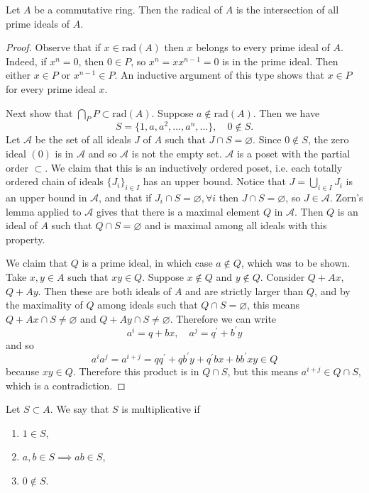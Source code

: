 \begin{theorem}
Let $A$ be a commutative ring. Then the radical of $A$ is the
intersection of all prime ideals of $A$.
\end{theorem}
\begin{proof}
Observe that if $x \in \mathrm{rad}(A)$ then $x$ belongs to every
prime ideal of $A$. Indeed, if $x^n = 0$, then $0 \in P$, so
$x^n = x x^{n-1} = 0$ is in the prime ideal. Then either $x \in P$ or
$x^{n-1} \in P$. An inductive argument of this type shows that $x \in
P$ for every prime ideal $x$.

Next show that $\bigcap_P P \subset \mathrm{rad}(A)$.
Suppose $a \notin \mathrm{rad}(A)$. Then we have
$$
S = \{1, a, a^2, \dots, a^n, \dots \}, \quad
0 \notin S.
$$
Let $\mathcal{A}$ be the set of all ideals $J$ of $A$ such that
$J \cap S = \varnothing$. Since $0 \notin S$, the zero ideal $(0)$
is in $\mathcal{A}$ and so $\mathcal{A}$ is not the empty set.
$\mathcal{A}$ is a poset with the partial order $\subset$. We claim
that this is an inductively ordered poset, i.e. each totally ordered
chain of ideals $\{J_i\}_{i \in I}$ has an upper bound. Notice that
$J = \bigcup_{i \in I} J_i$ is an upper bound in $\mathcal{A}$, and
that if $J_i \cap S = \varnothing, \forall i$ then $J \cap S =
\varnothing$, so $J \in \mathcal{A}$. Zorn's lemma applied to
$\mathcal{A}$ gives that there is a maximal element $Q$ in
$\mathcal{A}$. Then $Q$ is an ideal of $A$ such that
$Q \cap S = \varnothing$ and is maximal among all ideals with this
property.

We claim that $Q$ is a prime ideal, in which case $a \notin Q$, which
was to be shown. Take $x, y \in A$ such that $xy \in Q$. Suppose
$x \notin Q$ and $y \notin Q$. Consider $Q + Ax$, $Q + Ay$. Then these
are both ideals of $A$ and are strictly larger than $Q$, and by the
maximality of $Q$ among ideals such that $Q \cap S = \varnothing$,
this means $Q + Ax \cap S \neq \varnothing$ and
$Q + Ay \cap S \neq \varnothing$. Therefore we can write
$$
a^i = q + bx, \quad
a^j = q^\prime + b^\prime y
$$
and so
$$
  a^i a^j
= a^{i + j}
= q q^\prime + q b^\prime y + q^\prime b x + b b^\prime xy \in Q
$$
because $xy \in Q$. Therefore this product is in $Q \cap S$, but this
means $a^{i+j} \in Q \cap S$, which is a contradiction.
\end{proof}

\begin{defn}
Let $S \subset A$. We say that $S$ is multiplicative if
\begin{enumerate}
  \item{
    $1 \in S$,
  }
  \item{
    $a, b \in S \implies ab \in S$,
  }
  \item{
    $0 \notin S$.
  }
\end{enumerate}
\end{defn}

